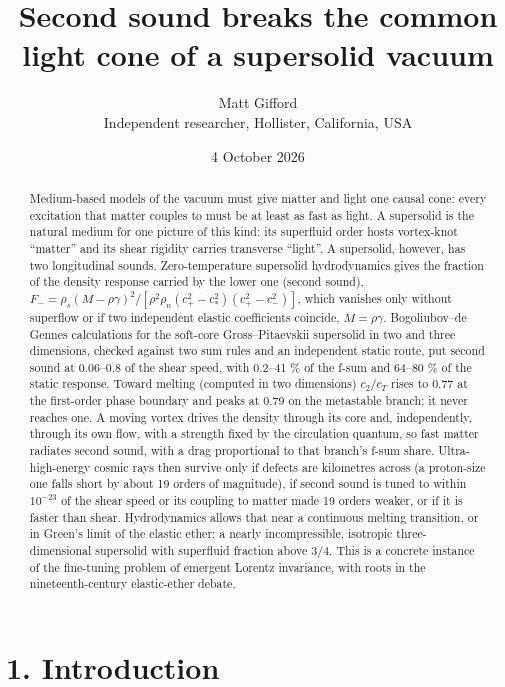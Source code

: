 \documentclass[
  11pt,
]{article}
\title{Second sound breaks the common light cone of a supersolid vacuum}
\author{Matt Gifford\\[2pt]{\normalsize Independent researcher, Hollister, California, USA}}
\date{4 October 2026}
\begin{document}
\maketitle
\begin{abstract}
Medium-based models of the vacuum must give matter and light one causal
cone: every excitation that matter couples to must be at least as fast
as light. A supersolid is the natural medium for one picture of this
kind: its superfluid order hosts vortex-knot ``matter'' and its shear
rigidity carries transverse ``light''. A supersolid, however, has two
longitudinal sounds. Zero-temperature supersolid hydrodynamics gives the
fraction of the density response carried by the lower one (second
sound),
\(F_- = \rho_s (M-\rho\gamma)^2/[\rho^2\rho_n (c_+^2-c_*^2)(c_+^2-c_-^2)]\),
which vanishes only without superflow or if two independent elastic
coefficients coincide, \(M=\rho\gamma\). Bogoliubov--de Gennes
calculations for the soft-core Gross--Pitaevskii supersolid in two and
three dimensions, checked against two sum rules and an independent
static route, put second sound at 0.06--0.8 of the shear speed, with
0.2--41 \% of the f-sum and 64--80 \% of the static response. Toward
melting (computed in two dimensions) \(c_2/c_T\) rises to 0.77 at the
first-order phase boundary and peaks at 0.79 on the metastable branch;
it never reaches one. A moving vortex drives the density through its
core and, independently, through its own flow, with a strength fixed by
the circulation quantum, so fast matter radiates second sound, with a
drag proportional to that branch's f-sum share. Ultra-high-energy cosmic
rays then survive only if defects are kilometres across (a proton-size
one falls short by about 19 orders of magnitude), if second sound is
tuned to within \(10^{-23}\) of the shear speed or its coupling to
matter made 19 orders weaker, or if it is faster than shear.
Hydrodynamics allows that near a continuous melting transition, or in
Green's limit of the elastic ether: a nearly incompressible, isotropic
three-dimensional supersolid with superfluid fraction above 3/4. This is
a concrete instance of the fine-tuning problem of emergent Lorentz
invariance, with roots in the nineteenth-century elastic-ether debate.
\end{abstract}

\hypertarget{introduction}{%
\section{1. Introduction}\label{introduction}}
\end{document}
